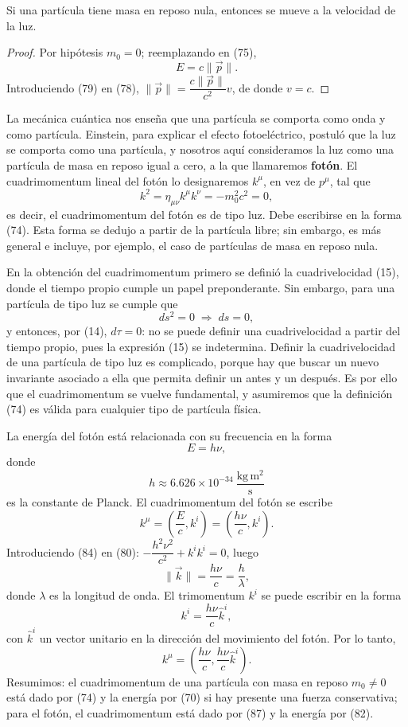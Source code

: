\begin{proposicionc}
Si una partícula tiene masa en reposo nula, entonces se mueve a la
velocidad de la luz.
\end{proposicionc}

\begin{proof}
Por hipótesis $m_0=0$; reemplazando en (75),
\[
E = c\|\vec p\| . \tag{79}
\]
Introduciendo (79) en (78), $\|\vec p\|=\dfrac{c\|\vec p\|}{c^2}v$, de
donde $v=c$. \qedhere
\end{proof}

La mecánica cuántica nos enseña que una partícula se comporta como onda
y como partícula. Einstein, para explicar el efecto fotoeléctrico,
postuló que la luz se comporta como una partícula, y nosotros aquí
consideramos la luz como una partícula de masa en reposo igual a cero, a
la que llamaremos \textbf{fotón}. El cuadrimomentum lineal del fotón lo
designaremos $k^\mu$, en vez de $p^\mu$, tal que
\[
k^2 = \eta_{\mu\nu}k^\mu k^\nu = -m_0^2c^2 = 0 , \tag{80}
\]
es decir, el cuadrimomentum del fotón es de tipo luz. Debe escribirse en
la forma (74). Esta forma se dedujo a partir de la partícula libre; sin
embargo, es más general e incluye, por ejemplo, el caso de partículas de
masa en reposo nula.

En la obtención del cuadrimomentum primero se definió la cuadrivelocidad
(15), donde el tiempo propio cumple un papel preponderante. Sin embargo,
para una partícula de tipo luz se cumple que
\[
ds^2=0 \;\Rightarrow\; ds=0, \tag{81}
\]
y entonces, por (14), $d\tau=0$: no se puede definir una cuadrivelocidad
a partir del tiempo propio, pues la expresión (15) se indetermina.
Definir la cuadrivelocidad de una partícula de tipo luz es complicado,
porque hay que buscar un nuevo invariante asociado a ella que permita
definir un antes y un después. Es por ello que el cuadrimomentum se
vuelve fundamental, y asumiremos que la definición (74) es válida para
cualquier tipo de partícula física.

La energía del fotón está relacionada con su frecuencia en la forma
\[
E = h\nu, \tag{82}
\]
donde
\[
h \approx 6.626\times10^{-34}\ \frac{\text{kg}\,\text{m}^2}{\text{s}}
\tag{83}
\]
es la constante de Planck. El cuadrimomentum del fotón se escribe
\[
k^\mu = \left(\frac Ec,k^i\right) = \left(\frac{h\nu}{c},k^i\right).
\tag{84}
\]
Introduciendo (84) en (80): $-\dfrac{h^2\nu^2}{c^2}+k^ik^i=0$, luego
\[
\|\vec k\| = \frac{h\nu}{c} = \frac h\lambda, \tag{85}
\]
donde $\lambda$ es la longitud de onda. El trimomentum $k^i$ se puede
escribir en la forma
\[
k^i = \frac{h\nu}{c}\hat k^i, \tag{86}
\]
con $\hat k^i$ un vector unitario en la dirección del movimiento del
fotón. Por lo tanto,
\[
k^\mu = \left(\frac{h\nu}{c},\frac{h\nu}{c}\hat k^i\right). \tag{87}
\]
Resumimos: el cuadrimomentum de una partícula con masa en reposo
$m_0\neq0$ está dado por (74) y la energía por (70) si hay presente una
fuerza conservativa; para el fotón, el cuadrimomentum está dado por (87)
y la energía por (82).

